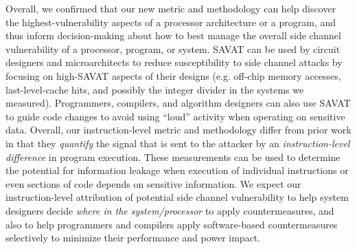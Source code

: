 Overall, we confirmed that our new metric and methodology can help discover the highest-vulnerability aspects of a processor architecture or a program, and thus inform decision-making about how to best manage the overall side channel vulnerability of a processor, program, or system. SAVAT can be used by circuit designers and microarchitects to reduce susceptibility to side channel attacks by focusing on high-SAVAT aspects of their designs (e.g. off-chip memory accesses, last-level-cache hits, and possibly the integer divider in the systems we measured). Programmers, compilers, and algorithm designers can also use SAVAT to guide code changes to avoid using ``loud'' activity when operating on sensitive data. Overall, our instruction-level metric and methodology differ from prior work in that they {\em quantify} the signal that is sent to the attacker by an {\em instruction-level difference} in program execution. These measurements can be used to determine the potential for information leakage when execution of individual instructions or even sections of code depends on sensitive information. We expect our instruction-level attribution of potential side channel vulnerability to help system designers decide {\em where in the system/processor} to apply countermeasures, and also to help programmers and compilers apply software-based countermeasures selectively to minimize their performance and power impact.
